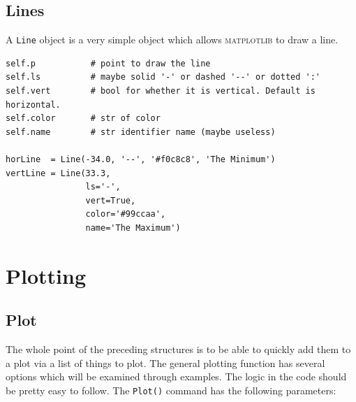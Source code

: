 \documentclass[10pt]{report}
\begin{document}
\section{Lines}
A \texttt{Line} object is a very simple object which allows \textsc{matplotlib} to draw a line.
\begin{lstlisting}[caption={Line properties and initiation}, style=properties]
self.p           # point to draw the line
self.ls          # maybe solid '-' or dashed '--' or dotted ':'
self.vert        # bool for whether it is vertical. Default is horizontal.
self.color       # str of color
self.name        # str identifier name (maybe useless)

horLine  = Line(-34.0, '--', '#f0c8c8', 'The Minimum')
vertLine = Line(33.3,
                ls='-',
                vert=True,
                color='#99ccaa',
                name='The Maximum')
\end{lstlisting}









\chapter{Plotting}


\section{Plot}
The whole point of the preceding structures is to be able to quickly add them to a plot via a list of things to plot. The general plotting function has several options which will be examined through examples. The logic in the code should be pretty easy to follow. The \texttt{Plot()} command has the following parameters:
\end{document}
